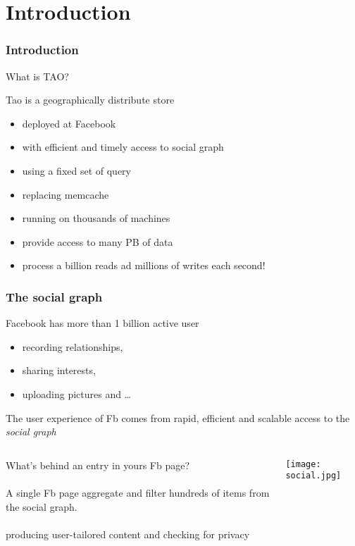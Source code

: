 \setlength{\parskip}{\baselineskip} 
\section*{Introduction}
\begin{frame}[t]
\frametitle{Introduction}
What is TAO?

\begin{block}{Tao}
	is a geographically distribute store
	\begin{itemize}
		\item deployed at Facebook
	 	\item with efficient and timely access to social graph
	 	\item using a fixed set of query
	 	\item replacing memcache
	 	\item running on thousands of machines
	 	\item provide access to many PB of data
	 	\item process a billion reads ad millions of writes each second!
	 \end{itemize} 
\end{block}
\end{frame}

\begin{frame}
\frametitle{The social graph}
Facebook has more than 1 billion active user 
\begin{itemize}
	\item recording relationships,
	\item sharing interests,
	\item uploading pictures and \dots
\end{itemize}

The user experience of Fb comes from rapid, efficient and scalable access to the \emph{social graph}
\end{frame}

\begin{frame}
\begin{columns}
	\begin{column}{0.3\textwidth}
	What's behind an entry in yours Fb page?
	\\~\\
		A single Fb page aggregate and filter hundreds of items from the social graph.
		\\~\\
		producing user-tailored content and checking for privacy %
	\end{column}%
	\begin{column}{0.6\textwidth}%
		\texttt{[image: social.jpg]}%
	\end{column}%
\end{columns}%
\end{frame}%

